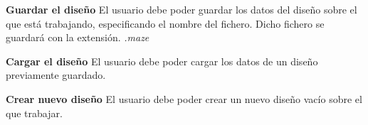 \begin{functional}
	\item \textbf{Guardar el diseño}\newline
		El usuario debe poder guardar los datos del diseño sobre el que está trabajando, especificando el nombre del fichero. Dicho fichero se guardará con la extensión. \textit{.maze}
	\item \textbf{Cargar el diseño}\newline
		El usuario debe poder cargar los datos de un diseño previamente guardado.
	\item \textbf{Crear nuevo diseño}\newline
		El usuario debe poder crear un nuevo diseño vacío sobre el que trabajar.
\end{functional}
